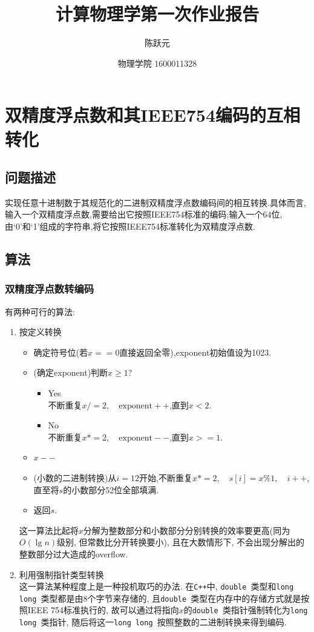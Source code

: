 \documentclass[UTF-8]{article}
\title{计算物理学第一次作业报告}
\author{陈跃元}
\date{物理学院 1600011328}
\begin{document}
	\maketitle
\section{双精度浮点数和其IEEE754编码的互相转化}
\subsection{问题描述}
实现任意十进制数于其规范化的二进制双精度浮点数编码间的相互转换.具体而言,输入一个双精度浮点数,需要给出它按照IEEE754标准的编码;输入一个64位,由‘0’和‘1’组成的字符串,将它按照IEEE754标准转化为双精度浮点数.
\subsection{算法}
\subsubsection{双精度浮点数转编码}
有两种可行的算法:
\begin{enumerate}
\item 按定义转换
	\begin{itemize}
		\item 确定符号位(若$x==0$直接返回全零),exponent初始值设为1023.
		\item (确定exponent)判断$x\geqslant1$?
		\begin{itemize}
			\item Yes \\
			不断重复$x/=2,\quad\text{exponent}++$,直到$x<2$.
			\item No \\
			不断重复$x*=2,\quad\text{exponent}--$,直到$x>=1$.
		\end{itemize}
		\item $x--$
		\item (小数的二进制转换)从$i=12$开始,不断重复$x*=2,\quad s[i]=x\%1,\quad i++$,直至将$s$的小数部分52位全部填满.
		\item 返回$s$.
	\end{itemize}
	这一算法比起将$x$分解为整数部分和小数部分分别转换的效率要更高(同为$O(\lg n)$级别, 但常数比分开转换要小), 且在大数情形下, 不会出现分解出的整数部分过大造成的overflow. 
\item 利用强制指针类型转换\\
	这一算法某种程度上是一种投机取巧的办法. 在\texttt{C++}中, \texttt{double }类型和\texttt{long long }类型都是由8个字节来存储的, 且\texttt{double }类型在内存中的存储方式就是按照IEEE 754标准执行的, 故可以通过将指向$x$的\texttt{double }类指针强制转化为\texttt{long long }类指针, 随后将这一\texttt{long long }按照整数的二进制转换来得到编码.
\end{enumerate}
\end{document}
